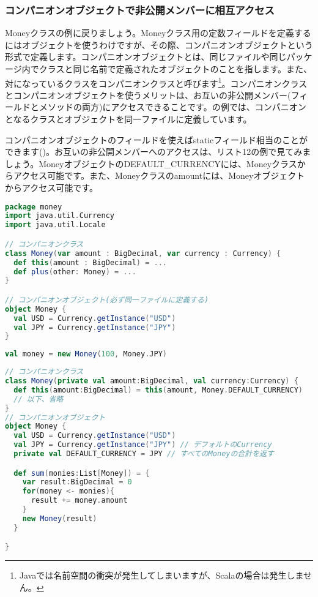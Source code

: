 \subsubsection{コンパニオンオブジェクトで非公開メンバーに相互アクセス}
Moneyクラスの例に戻りましょう。Moneyクラス用の定数フィールドを定義するにはオブジェクトを使うわけですが、その際、コンパニオンオブジェクトという形式で定義します。コンパニオンオブジェクトとは、同じファイルや同じパッケージ内でクラスと同じ名前で定義されたオブジェクトのことを指します。また、対になっているクラスをコンパニオンクラスと呼びます\footnote{Javaでは名前空間の衝突が発生してしまいますが、Scalaの場合は発生しません。}。コンパニオンクラスとコンパニオンオブジェクトを使うメリットは、お互いの非公開メンバー(フィールドとメソッドの両方)にアクセスできることです。の例では、コンパニオンとなるクラスとオブジェクトを同一ファイルに定義しています。

コンパニオンオブジェクトのフィールドを使えばstaticフィールド相当のことができます()。お互いの非公開メンバーへのアクセスは、リスト12の例で見てみましょう。MoneyオブジェクトのDEFAULT\_CURRENCYには、Moneyクラスからアクセス可能です。また、Moneyクラスのamountには、Moneyオブジェクトからアクセス可能です。

\begin{lstlisting}[language=scala, label=src:companion_object, caption=コンパニオンオブジェクトの例。コンパニオンとなるクラスとオブジェクトを同一ファイルに定義する]
package money
import java.util.Currency
import java.util.Locale

// コンパニオンクラス
class Money(var amount : BigDecimal, var currency : Currency) {
  def this(amount : BigDecimal) = ...
  def plus(other: Money) = ...
}

// コンパニオンオブジェクト(必ず同一ファイルに定義する)
object Money {
  val USD = Currency.getInstance("USD")
  val JPY = Currency.getInstance("JPY")
}
\end{lstlisting}

\begin{lstlisting}[language=scala, label=src:object_field, caption=第二引数にコンパニオンオブジェクトのフィールドを指定]
val money = new Money(100, Money.JPY)
\end{lstlisting}

\begin{lstlisting}[language=scala, label=src:privilege_access, caption=コンパニオンオブジェクトを使えばお互いの非公開メンバーにアクセスできる。amountとDEFAULT\_CURRENCYは共にprivateであることに注目]
// コンパニオンクラス
class Money(private val amount:BigDecimal, val currency:Currency) {
  def this(amount:BigDecimal) = this(amount, Money.DEFAULT_CURRENCY)
  // 以下、省略
}
// コンパニオンオブジェクト
object Money {
  val USD = Currency.getInstance("USD")
  val JPY = Currency.getInstance("JPY") // デフォルトのCurrency
  private val DEFAULT_CURRENCY = JPY // すべてのMoneyの合計を返す

  def sum(monies:List[Money]) = {
    var result:BigDecimal = 0
    for(money <- monies){
      result += money.amount
    }
    new Money(result)
  }

}
\end{lstlisting}

